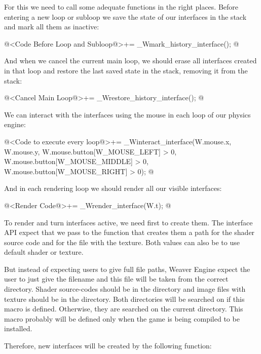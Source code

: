 For this we need to call some adequate functions in the right
places. Before entering a new loop or subloop we save the state of our
interfaces in the stack and mark all them as inactive:

\iniciocodigo
@<Code Before Loop and Subloop@>+=
_Wmark_history_interface();
@
\fimcodigo

And when we cancel the current main loop, we should erase all
interfaces created in that loop and restore the last saved state in
the stack, removing it from the stack:

\iniciocodigo
@<Cancel Main Loop@>+=
_Wrestore_history_interface();
@
\fimcodigo

We can interact with the interfaces using the mouse in each loop of
our physics engine:

\iniciocodigo
@<Code to execute every loop@>+=
_Winteract_interface(W.mouse.x, W.mouse.y,
                     W.mouse.button[W_MOUSE_LEFT] > 0,
                     W.mouse.button[W_MOUSE_MIDDLE] > 0,
                     W.mouse.button[W_MOUSE_RIGHT] > 0);
@
\fimcodigo

And in each rendering loop we should render all our visible
interfaces:

\iniciocodigo
@<Render Code@>+=
_Wrender_interface(W.t);
@
\fimcodigo

To render and turn interfaces active, we need first to create
them. The interface API expect that we pass to the function that
creates them a path for the shader source code and for the file with
the texture. Both values can also be  to use default
shader or texture.

But instead of expecting users to give full file paths, Weaver Engine
expect the user to just give the filename and this file will be taken
from the correct directory. Shader source-codes should be in
the  directory and image files with texture should
be in the  directory. Both directories will be
searched on  if this macro is
defined. Otherwise, they are searched on the current directory. This
macro probably will be defined only when the game is being compiled to
be installed.

Therefore, new interfaces will be created by the following function:

